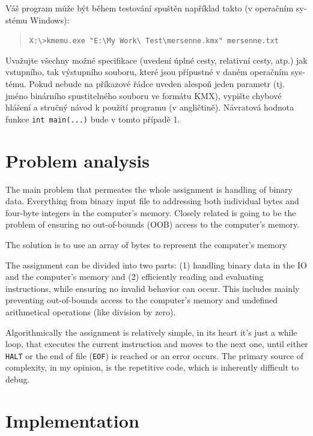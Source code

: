 \documentclass[12pt,a4paper]{paper}
\newcommand{\code}[1]{\texttt{#1}}
\begin{document}
\begin{otherlanguage}{czech}
\begin{enumerate}
\end{enumerate}

Váš program může být během testování spuštěn například takto (v operačním
systému Windows):


\begin{quotation}
\code{X:\textbackslash>kmemu.exe "E:\textbackslash My Work\textbackslash
Test\textbackslash mersenne.kmx"\ mersenne.txt}
\end{quotation}

Uvažujte všechny možné specifikace (uvedení úplné cesty, relativní cesty, atp.)
jak vstupního, tak výstupního souboru, které jsou přípustné v daném operačním
systému. Pokud nebude na příkazové řádce uveden alespoň jeden parametr (tj.
jméno binárního spustitelného souboru ve formátu KMX), vypište chybové hlášení a
stručný návod k použití programu (v angličtině). Návratová hodnota funkce
\code{int main(...)} bude v tomto případě 1.

\end{otherlanguage}

\section{Problem analysis}

The main problem that permeates the whole assignment is handling of binary data.
Everything from binary input file to addressing both individual bytes and
four-byte integers in the computer's memory. Closely related is going to be the
problem of ensuring no out-of-bounds (OOB) access to the computer's memory.

The solution is to use an array of bytes to represent the computer's memory


The assignment can be divided into two parts: (1) handling binary data in the IO
and the computer's memory and (2) efficiently reading and evaluating
instructions, while ensuring no invalid behavior can occur. This includes mainly
preventing out-of-bounds access to the computer's memory and undefined
arithmetical operations (like division by zero).

Algorithmically the assignment is relatively simple, in its heart it's just a
while loop, that executes the current instruction and moves to the next one,
until either \code{HALT} or the end of file (\code{EOF}) is reached or an error
occurs. The primary source of complexity, in my opinion, is the repetitive code,
which is inherently difficult to debug.

\section{Implementation}
\end{document}
